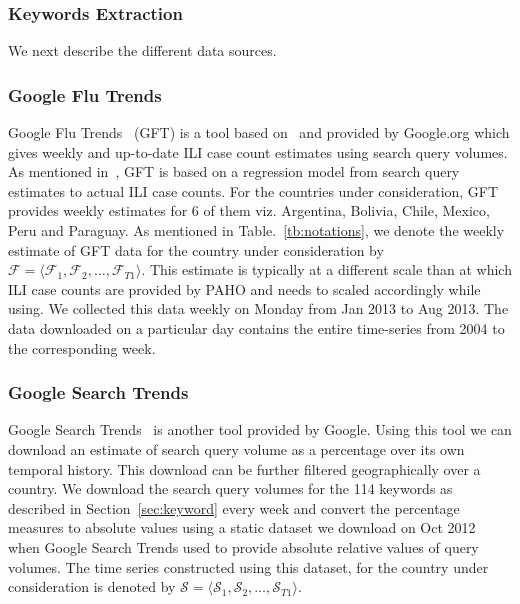 \subsubsection{\label{sec:keyword} Keywords Extraction}


We next describe the different data sources. 
\subsubsection{Google Flu Trends}
Google Flu Trends~\cite{GFT:2013} (GFT) is a tool based on~\cite{ginsberg2008detecting} 
and provided by Google.org which gives weekly and up-to-date ILI case count 
estimates using search query volumes. As mentioned in~\cite{ginsberg2008detecting},
GFT is based on a regression model from search query estimates to actual ILI case counts.
For the countries under consideration, GFT provides weekly estimates for 6 of them viz. 
Argentina, Bolivia, Chile, Mexico, Peru and Paraguay. As mentioned in 
Table.~\ref{tb:notations}, we denote the weekly estimate of GFT data for the country
under consideration by $\mathcal{F} = \langle \mathcal{F}_1, \mathcal{F}_2, \dots, 
\mathcal{F}_{T1} \rangle$. This estimate is typically at a different scale than at which 
ILI case counts are provided by PAHO and needs to scaled accordingly while using. 
We collected this data weekly on Monday from Jan 2013 to Aug 2013. The data downloaded on 
a particular day contains the entire time-series from 2004 to the corresponding week.  
 

\subsubsection{Google Search Trends}
Google Search Trends~\cite{GST:2013} is another tool provided by Google. Using this 
tool we can download an estimate of search query volume as a percentage over its own
temporal history. This download can be further filtered geographically over a country. 
We download the search query volumes for the 114 keywords as described in Section~\ref{sec:keyword}
every week and convert the percentage measures to absolute values using a static dataset 
we download on Oct 2012 when Google Search Trends used to provide absolute relative values of 
query volumes. The time series constructed using this dataset, for the country under consideration
is denoted by   
$\mathcal{S} = \langle \mathcal{S}_1, \mathcal{S}_2, \dots, \mathcal{S}_{T1} \rangle$. 
